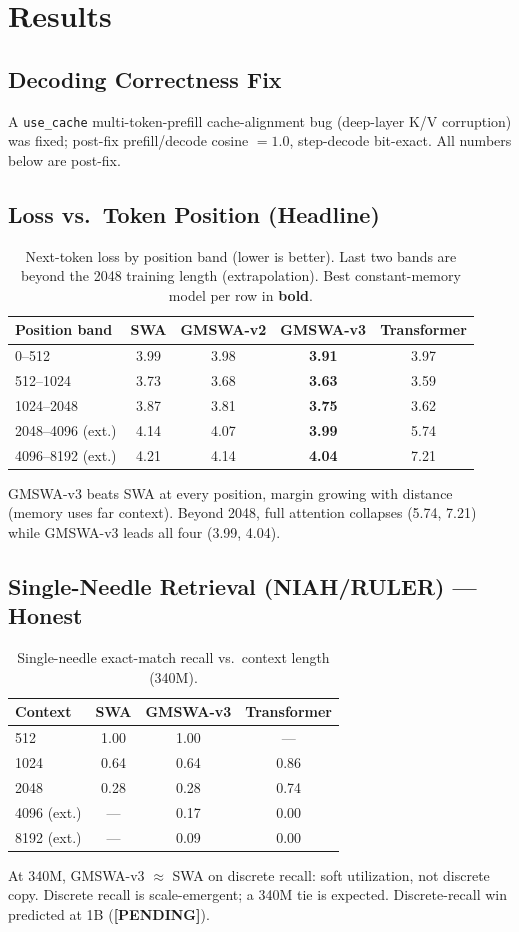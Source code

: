 \documentclass[11pt]{article}
\newcommand{\pending}{\textbf{[PENDING]}}
\begin{document}
\section{Results}
\subsection{Decoding Correctness Fix}
A \texttt{use\_cache} multi-token-prefill cache-alignment bug (deep-layer K/V corruption)
was fixed; post-fix prefill/decode cosine $=1.0$, step-decode bit-exact. All numbers below are post-fix.

\subsection{Loss vs.\ Token Position (Headline)}
\begin{table}[H]\centering
\caption{Next-token loss by position band (lower is better). Last two bands are beyond the
2048 training length (extrapolation). Best constant-memory model per row in \textbf{bold}.}
\label{tab:loss}
\begin{tabular}{lcccc}
\toprule
Position band & SWA & GMSWA-v2 & GMSWA-v3 & Transformer \\
\midrule
0--512            & 3.99 & 3.98 & \textbf{3.91} & 3.97 \\
512--1024         & 3.73 & 3.68 & \textbf{3.63} & 3.59 \\
1024--2048        & 3.87 & 3.81 & \textbf{3.75} & 3.62 \\
2048--4096 (ext.) & 4.14 & 4.07 & \textbf{3.99} & 5.74 \\
4096--8192 (ext.) & 4.21 & 4.14 & \textbf{4.04} & 7.21 \\
\bottomrule
\end{tabular}
\end{table}
GMSWA-v3 beats SWA at every position, margin growing with distance (memory uses far context).
Beyond 2048, full attention collapses (5.74, 7.21) while GMSWA-v3 leads all four (3.99, 4.04).

\subsection{Single-Needle Retrieval (NIAH/RULER) --- Honest}
\begin{table}[H]\centering
\caption{Single-needle exact-match recall vs.\ context length (340M).}
\label{tab:niah}
\begin{tabular}{lccc}
\toprule
Context & SWA & GMSWA-v3 & Transformer \\
\midrule
512  & 1.00 & 1.00 & --- \\
1024 & 0.64 & 0.64 & 0.86 \\
2048 & 0.28 & 0.28 & 0.74 \\
4096 (ext.) & --- & 0.17 & 0.00 \\
8192 (ext.) & --- & 0.09 & 0.00 \\
\bottomrule
\end{tabular}
\end{table}
At 340M, GMSWA-v3 $\approx$ SWA on discrete recall: soft utilization, not discrete copy.
Discrete recall is scale-emergent; a 340M tie is expected. Discrete-recall win predicted at 1B (\pending).
\end{document}
